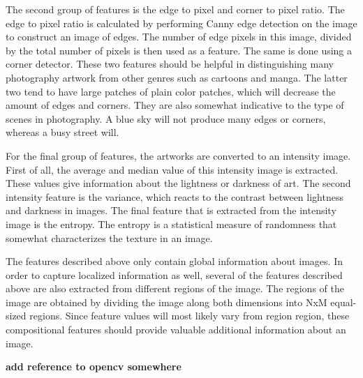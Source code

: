 The second group of features is the edge to pixel and corner to pixel ratio. The edge to pixel ratio is calculated by performing Canny edge detection on the image to construct an image of edges. The number of edge pixels in this image, divided by the total number of pixels is then used as a feature. The same is done using a corner detector. These two features should be helpful in distinguishing many photography artwork from other genres such as cartoons and manga. The latter two tend to have large patches of plain color patches, which will decrease the amount of edges and corners. They are also somewhat indicative to the type of scenes in photography. A blue sky will not produce many edges or corners, whereas a busy street will.  

For the final group of features, the artworks are converted to an intensity image. First of all, the average and median value of this intensity image is extracted. These values give information about the lightness or darkness of art. The second intensity feature is the variance, which reacts to the contrast between lightness and darkness in images. The final feature that is extracted from the intensity image is the entropy. The entropy is a statistical measure of randomness that somewhat characterizes the texture in an image.  

The features described above only contain global information about images. In order to capture localized information as well, several of the features described above are also extracted from different regions of the image. The regions of the image are obtained by dividing the image along both dimensions into NxM equal-sized regions. Since feature values will most likely vary from region region, these compositional features should provide valuable additional information about an image. 

\textbf{add reference to opencv somewhere}


